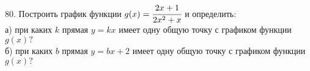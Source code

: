 80. Построить график функции $g(x)=\cfrac{2x+1}{2x^2+x}$ и определить:\\
а) при каких $k$ прямая $y=kx$ имеет одну общую точку с графиком функции $g(x)?$\\
б) при каких $b$ прямая $y=bx+2$ имеет одну общую точку с графиком функции $g(x)?$\\
